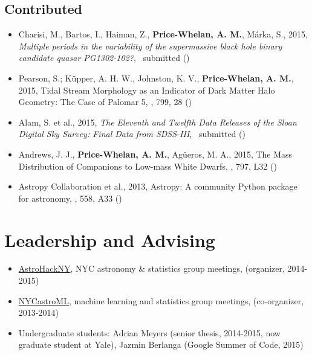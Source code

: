 \documentclass[12pt,letterpaper]{article}
\begin{document}
	\subsection*{Contributed}

	\begin{itemize}

\item Charisi, M., Bartos, I., Haiman, Z., {\bf Price-Whelan, A. M.}, M\'arka, S., 2015,
    \emph{Multiple periods in the variability of the supermassive black hole binary candidate quasar PG1302-102?},
    \mnras\ submitted ()

\item Pearson, S.; K\"upper, A. H. W., Johnston, K. V., {\bf Price-Whelan, A. M.}, 2015,
    {Tidal Stream Morphology as an Indicator of Dark Matter Halo Geometry: The Case of Palomar 5},
    \apj, 799, 28 ()

\item Alam, S. et al., 2015,
    \emph{The Eleventh and Twelfth Data Releases of the Sloan Digital Sky Survey: Final Data from SDSS-III},
    \apjs\ submitted ()

\item Andrews, J. J., {\bf Price-Whelan, A. M.}, Ag\"ueros, M. A., 2015,
    {The Mass Distribution of Companions to Low-mass White Dwarfs},
    \apjl, 797, L32 ()

\item Astropy Collaboration et al., 2013,
    {Astropy: A community Python package for astronomy},
    \aanda, 558, A33 ()

	\end{itemize}

\section*{Leadership and Advising}
	\begin{itemize}
	\item \href{https://groups.google.com/forum/#!forum/astrohackny}{AstroHackNY}, NYC astronomy \& statistics group meetings, (organizer, 2014-2015)
	\item \href{https://github.com/adrn/nycastroml}{NYCastroML}, machine learning and statistics group meetings, (co-organizer, 2013-2014)
	\item Undergraduate students: Adrian Meyers (senior thesis, 2014-2015, now graduate student at Yale), Jazmin Berlanga (Google Summer of Code, 2015)
	\end{itemize}
\end{document}
